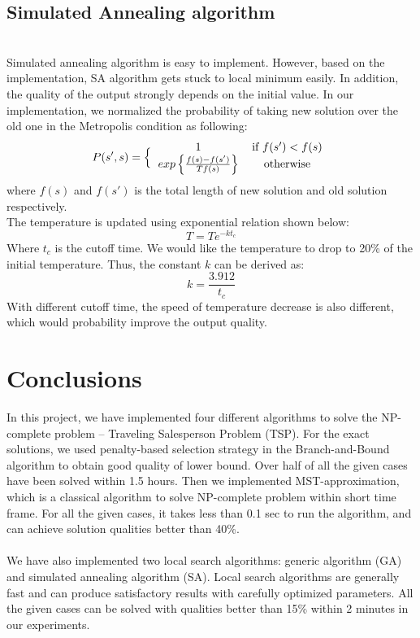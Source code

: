 \subsection{Simulated Annealing algorithm}
\hfill\\
Simulated annealing algorithm is easy to implement. However, based on the implementation, SA algorithm gets stuck to local minimum easily. In addition, the quality of the output strongly depends on the initial value. 
In our implementation, we normalized the probability of taking new solution over the old one in the Metropolis condition as following:
\[P(s', s)=\Big\{
\begin{tabular}{cc}
1 & if \(f(s') < f(s)\)\\
\(exp \left\{
\frac{f(s)-f(s')}{Tf(s)}
\right\}
\) & otherwise
\end{tabular}
\]
where \(f(s)\) and \(f(s')\) is the total length of new solution and old solution respectively.\\
The temperature is updated using exponential relation shown below:
\[T=Te^{-kt_c}\]
Where \(t_c\) is the cutoff time. We would like the temperature to drop to 20\% of the initial temperature. Thus, the constant \(k\) can be derived as:
\[k=\frac{3.912}{t_c}\]
With different cutoff time, the speed of temperature decrease is also different, which would probability improve the output quality.


\section{Conclusions}
In this project, we have implemented four different algorithms to solve the NP-complete problem – Traveling Salesperson Problem (TSP). For the exact solutions, we used penalty-based selection strategy in the Branch-and-Bound algorithm to obtain good quality of lower bound. Over half of all the given cases have been solved within 1.5 hours. Then we implemented MST-approximation, which is a classical algorithm to solve NP-complete problem within short time frame. For all the given cases, it takes less than 0.1 sec to run the algorithm, and can achieve solution qualities better than 40\%. \\ 
\hfil\\
We have also implemented two local search algorithms: generic algorithm (GA) and simulated annealing algorithm (SA). Local search algorithms are generally fast and can produce satisfactory results with carefully optimized parameters. All the given cases can be solved with qualities better than 15\% within 2 minutes in our experiments.   

